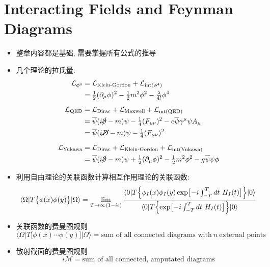 \chapter{Interacting Fields and Feynman Diagrams}

\begin{itemize}
  \item 整章内容都是基础, 需要掌握所有公式的推导
  \item 几个理论的拉氏量:
        \begin{align*}
          \mathcal{L}_{\phi^4}        & = \mathcal{L}_{\text{Klein-Gordon}} + \mathcal{L}_{\text{int(}\phi^4\text{)}}                                                      \\
                                      & = \tfrac{1}{2}(\partial_\mu \phi)^2 - \tfrac{1}{2}m^2\phi^2 - \tfrac{\lambda}{4!}\phi^4                                            \\[0.2cm]
          \mathcal{L}_{\text{QED}}    & = \mathcal{L}_{\text{Dirac}} + \mathcal{L}_{\text{Maxwell}} + \mathcal{L}_{\text{int(QED)}}                                        \\
                                      & = \overline{\psi}(i\cancel{\partial}-m)\psi - \tfrac{1}{4}(F_{\mu\nu})^2 - e\overline{\psi}\gamma^{\mu}\psi A_{\mu}                \\
                                      & = \overline{\psi}(i\cancel{D}-m)\psi - \tfrac{1}{4}(F_{\mu\nu})^2                                                                  \\[0.2cm]
          \mathcal{L}_{\text{Yukawa}} & = \mathcal{L}_{\text{Dirac}} + \mathcal{L}_{\text{Klein-Gordon}} + \mathcal{L}_{\text{int(Yukawa)}}                                \\
                                      & = \overline{\psi}(i\cancel{\partial}-m)\psi + \tfrac{1}{2}(\partial_\mu \phi)^2 - \tfrac{1}{2}m^2\phi^2 - g\overline{\psi}\psi\phi
        \end{align*}
  \item 利用自由理论的关联函数计算相互作用理论的关联函数:
        \begin{equation*}
          \langle \Omega|T \bigl\{\phi(x)\phi(y)\bigr\}|\Omega \rangle = \lim_{T\rightarrow \infty(1-i\epsilon)}\frac{\langle 0|T \Bigl\{\phi_I(x)\phi_I(y)\exp\bigl[-i\int_{-T}^{T}dt\ H_I(t)\bigr]\Bigr\}|0 \rangle}{\langle 0|T \Bigl\{\exp\bigl[-i\int_{-T}^{T}dt\ H_I(t)\bigr]\Bigr\}|0 \rangle}
        \end{equation*}
  \item 关联函数的费曼图规则
        \begin{equation*}
          \langle \Omega|T \bigl[\phi(x)\cdots\phi(y)\bigr]|\Omega \rangle = \text{sum of all connected diagrams with}\ n\ \text{external points}
        \end{equation*}
  \item 散射截面的费曼图规则
        \begin{equation*}
          i\mathcal{M} = \text{sum of all connected, amputated diagrams}
        \end{equation*}

\end{itemize}
\pagestyle{general}

